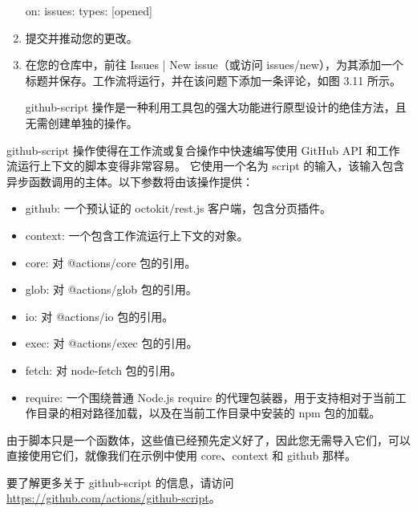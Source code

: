 \begin{enumerate}
\begin{shell}
on:
  issues:
    types: [opened]
\end{shell}

\item 
提交并推动您的更改。

\item 
在您的仓库中，前往 Issues | New issue（或访问 issues/new），为其添加一个标题并保存。工作流将运行，并在该问题下添加一条评论，如图 3.11 所示。


github-script 操作是一种利用工具包的强大功能进行原型设计的绝佳方法，且无需创建单独的操作。
\end{enumerate}


github-script 操作使得在工作流或复合操作中快速编写使用 GitHub API 和工作流运行上下文的脚本变得非常容易。 它使用一个名为 script 的输入，该输入包含异步函数调用的主体。以下参数将由该操作提供：

\begin{itemize}
\item 
github: 一个预认证的 octokit/rest.js 客户端，包含分页插件。

\item 
context: 一个包含工作流运行上下文的对象。

\item 
core: 对 @actions/core 包的引用。

\item 
glob: 对 @actions/glob 包的引用。

\item 
io: 对 @actions/io 包的引用。

\item 
exec: 对 @actions/exec 包的引用。

\item 
fetch: 对 node-fetch 包的引用。

\item 
require: 一个围绕普通 Node.js require 的代理包装器，用于支持相对于当前工作目录的相对路径加载，以及在当前工作目录中安装的 npm 包的加载。
\end{itemize}

由于脚本只是一个函数体，这些值已经预先定义好了，因此您无需导入它们，可以直接使用它们，就像我们在示例中使用 core、context 和 github 那样。

要了解更多关于 github-script 的信息，请访问 \url{https://github.com/actions/github-script}。

